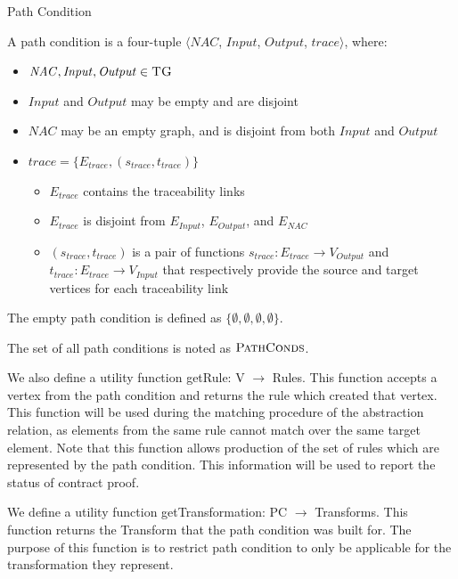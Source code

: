 \begin{definition}{Path Condition\\}
\label{def:path_condition}

A path condition is a four-tuple $\big\langle \mathit{NAC}$, $\mathit{Input}$, $\mathit{Output}$, $\mathit{trace}\big\rangle$, where:

\begin{itemize}
\item $\mathit{NAC}, \mathit{Input}, \mathit{Output} \in \textsc{TG}$
\item $\mathit{Input}$ and $\mathit{Output} $ may be empty and are disjoint
\item $\mathit{NAC}$ may be an empty graph, and is disjoint from both $\mathit{Input}$ and $\mathit{Output} $
\item $\mathit{trace} = \{E_{trace}, (s_{trace}, t_{trace})\}$
\begin{itemize}
\item $E_{trace}$ contains the traceability links
\item $E_{trace} $ is disjoint from $E_{Input}$, $E_{Output}$, and $E_{NAC}$
\item $(s_{trace}, t_{trace})$ is a pair of functions $s_{trace}: E_{trace}\rightarrow V_{\textit{Output}}$ and $t_{trace}: E_{trace}\rightarrow V_{\textit{Input}}$ that respectively provide the source and target vertices for each traceability link
\end{itemize}

\end{itemize}  

The empty path condition is defined as $\{\emptyset, \emptyset, \emptyset, \emptyset \}$.

The set of all path conditions is noted as $\textsc{PathConds}$.

We also define a utility function getRule: V $\rightarrow$ Rules. This function accepts a vertex from the path condition and returns the rule which created that vertex. This function will be used during the matching procedure of the abstraction relation, as elements from the same rule cannot match over the same target element. Note that this function allows production of the set of rules which are represented by the path condition. This information will be used to report the status of contract proof. 

We define a utility function getTransformation: PC $\rightarrow$ Transforms. This function returns the Transform that the path condition was built for. The purpose of this function is to restrict path condition to only be applicable for the transformation they represent.



\end{definition}


